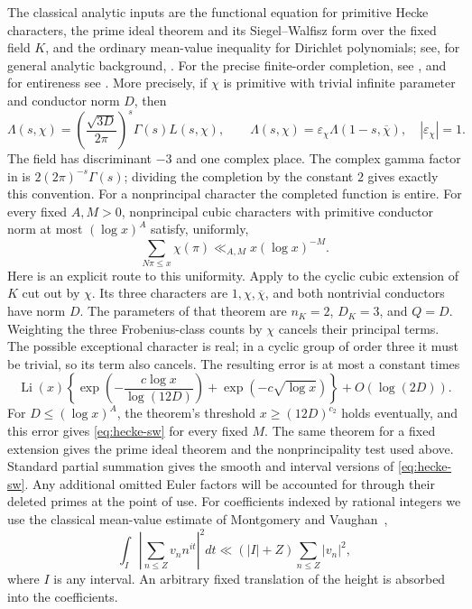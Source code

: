 The classical analytic inputs are the functional equation for primitive
Hecke characters, the prime ideal theorem and its Siegel--Walfisz form
over the fixed field $K$, and the ordinary mean-value inequality for
Dirichlet polynomials; see, for general analytic background,
\cite{IwaniecKowalski2004}. For the precise finite-order completion,
see \cite[Section 3.6]{Watkins2011}, and for entireness see
\cite[Section 2C]{ThornerZaman2019}. More precisely, if $\chi$ is primitive with
trivial infinite parameter and conductor norm $D$, then
\[
 \Lambda(s,\chi)
 =\left(\frac{\sqrt{3D}}{2\pi}\right)^s\Gamma(s)L(s,\chi),
 \qquad
 \Lambda(s,\chi)=\varepsilon_\chi\Lambda(1-s,\overline\chi),
 \quad |\varepsilon_\chi|=1.
\]
The field has discriminant $-3$ and one complex place. The complex
gamma factor in \cite{Watkins2011} is
$2(2\pi)^{-s}\Gamma(s)$; dividing the completion by the constant $2$
gives exactly this convention. For a nonprincipal character the
completed function is entire.
For every fixed $A,M>0$, nonprincipal cubic characters with primitive
conductor norm at most $(\log x)^A$ satisfy, uniformly,
\begin{equation}
 \sum_{N\pi\le x}\chi(\pi)\ll_{A,M}x(\log x)^{-M}.
 \label{eq:hecke-sw}
\end{equation}
Here is an explicit route to this uniformity. Apply
\cite[Theorem 1.4]{ThornerZaman2019} to the cyclic cubic extension of
$K$ cut out by $\chi$. Its three characters are
$1,\chi,\overline\chi$, and both nontrivial conductors have norm $D$.
The parameters of that theorem are $n_K=2$, $D_K=3$, and $Q=D$.
Weighting the three Frobenius-class counts by $\chi$ cancels their
principal terms. The possible exceptional character is real; in a
cyclic group of order three it must be trivial, so its term also
cancels. The resulting error is at most a constant times
\[
 \operatorname{Li}(x)\left\{
   \exp\!\left(-\frac{c\log x}{\log(12D)}\right)
       +\exp(-c\sqrt{\log x})\right\}+O(\log(2D)).
\]
For $D\le(\log x)^A$, the theorem's threshold
$x\ge(12D)^{c_2}$ holds eventually, and this error gives
\eqref{eq:hecke-sw} for every fixed $M$. The same theorem for a fixed
extension gives the prime ideal theorem and the nonprincipality test
used above. Standard partial summation gives the smooth and interval
versions of \eqref{eq:hecke-sw}. Any additional omitted Euler factors
will be accounted for through their deleted primes at the point of use.
For coefficients indexed by rational integers we use the classical
mean-value estimate of Montgomery and Vaughan~\cite{MontgomeryVaughan1974},
\begin{equation}
 \int_I\left|\sum_{n\le Z}v_n n^{it}\right|^2dt
 \ll (|I|+Z)\sum_{n\le Z}|v_n|^2,
 \label{eq:ordinary-mean-value}
\end{equation}
where $I$ is any interval. An arbitrary fixed translation of the height
is absorbed into the coefficients.

